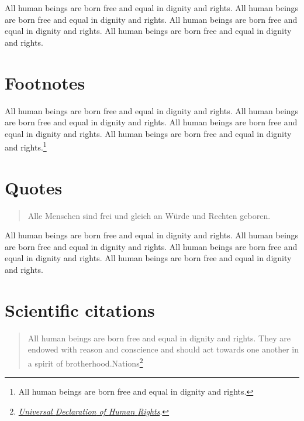 \documentclass[
  titlepage,
  openright,
  DIV=calc,
  toc=listof,
  listof=nochaptergap]{scrbook}
\begin{document}
All human beings are born free and equal in dignity and rights. All
human beings are born free and equal in dignity and rights. All human
beings are born free and equal in dignity and rights. All human beings
are born free and equal in dignity and rights.

\hypertarget{footnotes}{%
\section{Footnotes}\label{footnotes}}

All human beings are born free and equal in dignity and rights. All
human beings are born free and equal in dignity and rights. All human
beings are born free and equal in dignity and rights. All human beings
are born free and equal in dignity and rights.\footnote{All human beings
  are born free and equal in dignity and rights.}

\hypertarget{quotes}{%
\section{Quotes}\label{quotes}}

\begin{otherlanguage}{ngerman}

\begin{quote}
Alle Menschen sind frei und gleich an Würde und Rechten geboren.
\end{quote}

\end{otherlanguage}

All human beings are born free and equal in dignity and rights. All
human beings are born free and equal in dignity and rights. All human
beings are born free and equal in dignity and rights. All human beings
are born free and equal in dignity and rights.

\hypertarget{scientific-citations}{%
\section{Scientific citations}\label{scientific-citations}}

\begin{quote}
All human beings are born free and equal in dignity and rights. They are
endowed with reason and conscience and should act towards one another in
a spirit of brotherhood.Nations\footnote{\protect\hyperlink{ref-unitednations1948}{\emph{Universal
  {Declaration} of {Human} {Rights}}}.}
\end{quote}
\end{document}

